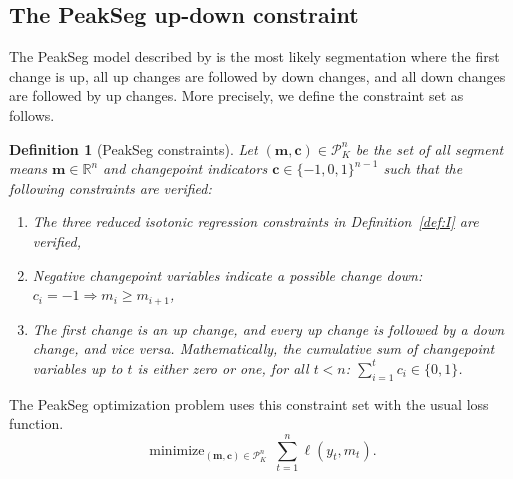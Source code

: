 \documentclass{article}
\newtheorem{definition}{Definition}
\DeclareMathOperator*{\minimize}{minimize}
\newcommand{\RR}{\mathbb R}
\begin{document}
\subsection{The PeakSeg up-down constraint}
\label{sec:PeakSeg}

The PeakSeg model described by \citet{HOCKING-PeakSeg} is the most
likely segmentation where the first change is up, all up changes are
followed by down changes, and all down changes are followed by up
changes. More precisely, we define the constraint set as follows.
\begin{definition}[PeakSeg constraints]
  \label{def:U}
  Let $(\mathbf m, \mathbf c)\in\mathcal P_K^n$ be the set of all
  segment means $\mathbf m\in\RR^n$ and changepoint indicators
  $\mathbf c\in\{-1, 0,1\}^{n-1}$ such that the following constraints
  are verified:
  \begin{enumerate}
  \item The three reduced isotonic regression constraints in
    Definition~\ref{def:I} are verified,
  \item Negative changepoint variables indicate a possible change down:
    $c_i = -1 \Rightarrow m_i \geq m_{i+1}$,
  \item The first change is an up change, and every up change is followed by a
    down change, and vice versa. Mathematically, the cumulative sum of
    changepoint variables up to $t$ is either zero or one, for all $t<n$:
    $\sum_{i=1}^t c_i \in \{0, 1\}$.
  \end{enumerate}
\end{definition}
The PeakSeg
optimization problem uses this constraint set with the usual loss
function.
\begin{equation}
\label{eq:min_PeakSeg}
    \minimize_{
        (\mathbf m, \mathbf c)\in\mathcal P^n_K
      } \ 
\sum_{t=1}^n \ell(y_t, m_t).
\end{equation}
\end{document}
